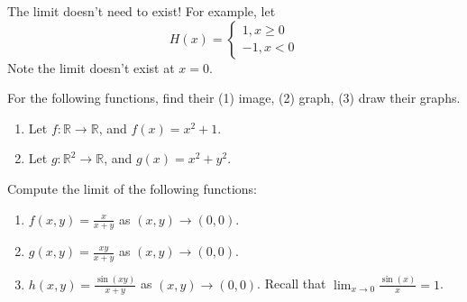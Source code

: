 \documentclass[openany]{book}
\newcommand{\R}{\mathbb{R}}
\begin{document}
\begin{example}
    The limit doesn't need to exist! For example, let 
    \begin{equation*}
        H(x)=\begin{cases}
            1, x\geq 0\\
            -1, x<0
        \end{cases}
    \end{equation*}
    Note the limit doesn't exist at $x=0$.
\end{example}






\begin{prob}
    For the following functions, find their (1) image, (2) graph, (3) draw their graphs.
    \begin{enumerate}
        \item  Let $f: \R\to\R$, and $f(x)=x^2+1$.
        \item Let $g: \R^2\to \R$, and $g(x)=x^2+y^2$.
    \end{enumerate}
\end{prob}


\begin{prob}
    Compute the limit of the following functions:
    \begin{enumerate}
        \item $f(x,y)=\frac{x}{x+y}$ as $(x,y)\to (0,0)$.
        \item $g(x,y)=\frac{xy}{x+y}$ as $(x,y)\to (0,0)$.
        \item $h(x,y)=\frac{\sin(xy)}{x+y}$ as $(x,y)\to (0,0)$. Recall that $\lim_{x\to 0}\frac{\sin(x)}{x}=1$.
    \end{enumerate}
\end{prob}
















\end{document}
